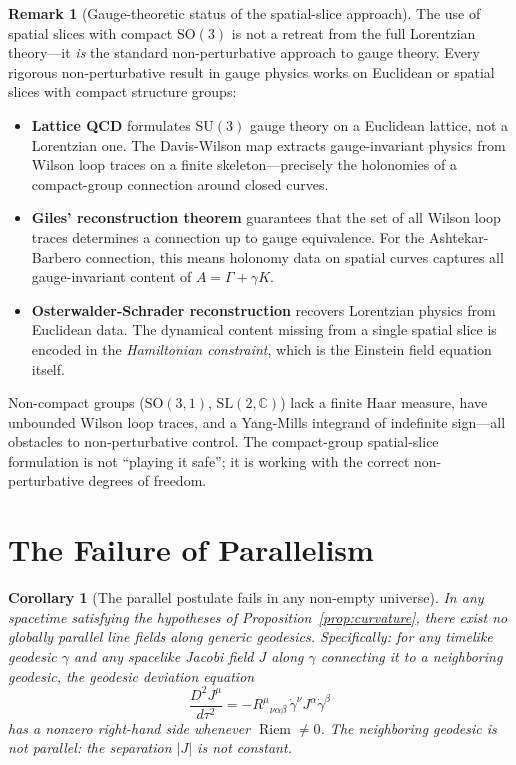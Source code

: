 \documentclass[12pt]{amsart}
\newtheorem{corollary}[theorem]{Corollary}
\theoremstyle{definition}
\newtheorem{remark}[theorem]{Remark}
\newcommand{\Riem}{\operatorname{Riem}}
\begin{document}
\begin{remark}[Gauge-theoretic status of the spatial-slice approach]
\label{rmk:gauge}
The use of spatial slices with compact $\mathrm{SO}(3)$ is not a retreat from the full Lorentzian theory---it \emph{is} the standard non-perturbative approach to gauge theory.  Every rigorous non-perturbative result in gauge physics works on Euclidean or spatial slices with compact structure groups:
\begin{itemize}
\item \textbf{Lattice QCD} formulates $\mathrm{SU}(3)$ gauge theory on a Euclidean lattice, not a Lorentzian one.  The Davis-Wilson map \cite{davis2026ym} extracts gauge-invariant physics from Wilson loop traces on a finite skeleton---precisely the holonomies of a compact-group connection around closed curves.
\item \textbf{Giles' reconstruction theorem} \cite{giles1981} guarantees that the set of all Wilson loop traces determines a connection up to gauge equivalence.  For the Ashtekar-Barbero connection, this means holonomy data on spatial curves captures all gauge-invariant content of $A = \Gamma + \gamma K$.
\item \textbf{Osterwalder-Schrader reconstruction} recovers Lorentzian physics from Euclidean data.  The dynamical content missing from a single spatial slice is encoded in the \emph{Hamiltonian constraint}, which is the Einstein field equation itself.
\end{itemize}
Non-compact groups ($\mathrm{SO}(3,1)$, $\mathrm{SL}(2,\mathbb{C})$) lack a finite Haar measure, have unbounded Wilson loop traces, and a Yang-Mills integrand of indefinite sign---all obstacles to non-perturbative control.  The compact-group spatial-slice formulation is not ``playing it safe''; it is working with the correct non-perturbative degrees of freedom.
\end{remark}


\section{The Failure of Parallelism}

\begin{corollary}[The parallel postulate fails in any non-empty universe]
\label{cor:noparallel}
In any spacetime satisfying the hypotheses of Proposition~\ref{prop:curvature}, there exist no globally parallel line fields along generic geodesics.  Specifically: for any timelike geodesic $\gamma$ and any spacelike Jacobi field $J$ along $\gamma$ connecting it to a neighboring geodesic, the geodesic deviation equation
\[
\frac{D^2 J^\mu}{d\tau^2} = -R^\mu{}_{\nu\alpha\beta}\, \dot\gamma^\nu J^\alpha \dot\gamma^\beta
\]
has a nonzero right-hand side whenever $\Riem \neq 0$.  The neighboring geodesic is not parallel: the separation $|J|$ is not constant.
\end{corollary}
\end{document}
